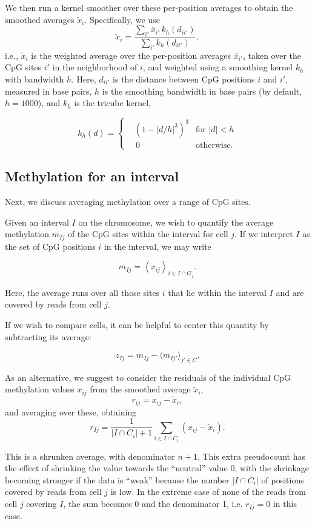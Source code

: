 \documentclass[twocolumn,10pt]{article}
\begin{document}
We then run a kernel smoother over these per-position averages to obtain the smoothed averages $\tilde x_i$.
Specifically, we use
\[ \tilde x_i = \frac{\sum_{i'} \overline x_{i'}\, k_h(d_{ii'})}{\sum_{i'} k_h(d_{ii'})},\]
i.e., $\tilde x_i$ is the weighted average over the per-position averages $\overline{x}_{i'}$, taken over the CpG sites $i'$ in the neighborhood of $i$, and weighted using a smoothing kernel $k_h$ with bandwidth $h$.
Here, $d_{ii'}$ is the distance between CpG positions $i$ and $i'$, measured in base pairs, $h$ is the smoothing bandwidth in base pairs (by default, $h=1000$), and $k_h$ is the tricube kernel,

\[ k_h(d) = \left\{
\begin{aligned}
    &\left(1-|d/h|^3\right)^3 &\text{for } |d|<h \\
    &\,0 &\text{otherwise}.
\end{aligned}
\right.
\]

\subsection{Methylation for an interval}

Next, we discuss averaging methylation over a range of CpG sites.

Given an interval $I$ on the chromosome, we wish to quantify the average methylation $m_{Ij}$ of the CpG sites within the interval for cell $j$.
If we interpret $I$ as the set of CpG positions $i$ in the interval, we may write

\[ m_{Ij} = \left< x_{ij} \right>_{i\in I\cap G_j}.\]

Here, the average runs over all those sites $i$ that lie within the interval $I$ and are covered by reads from cell $j$.

If we wish to compare cells, it can be helpful to center this quantity by subtracting its average:

\[ z_{Ij} = m_{Ij} - \langle m_{Ij'}\rangle_{j'\in C}.\]

As an alternative, we suggest to consider the residuals of the individual CpG methylation values $x_{ij}$ from the smoothed average $\tilde x_i$,
\[ r_{ij} = x_{ij} - \tilde x_i, \]
and averaging over these, obtaining
\begin{equation} 
r_{Ij} = \frac{1}{|I\cap C_i|+1}\sum_{i\in I\cap C_i}\left( x_{ij} - \tilde x_i \right).
\label{avgres}
\end{equation}

This is a shrunken average, with denominator $n+1$.
This extra pseudocount has the effect of shrinking the value towards the ``neutral'' value 0, with the shrinkage becoming stronger if the data is ``weak'' because the number $|I\cap C_i|$ of positions covered by reads from cell $j$  is low.
In the extreme case of none of the reads from cell $j$ covering $I$, the sum becomes 0 and the denominator 1, i.e.
$r_{Ij}=0$ in this case.
\end{document}
